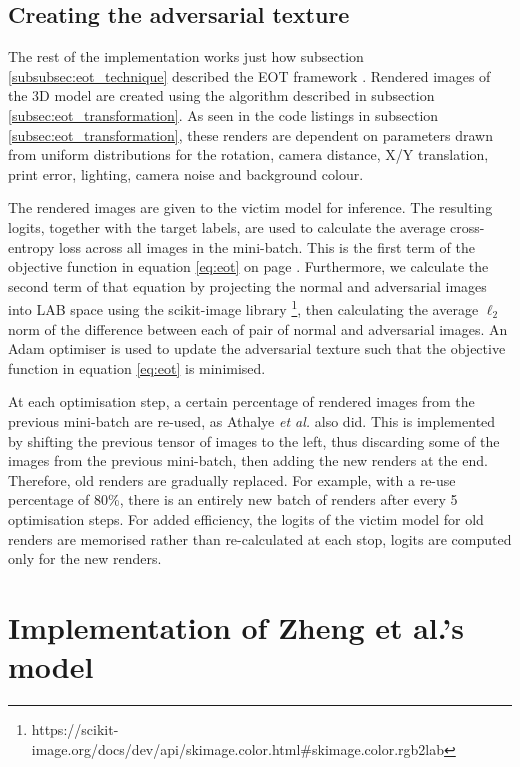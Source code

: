 \subsection{Creating the adversarial texture}

The rest of the implementation works just how subsection \ref{subsubsec:eot_technique} described the EOT framework \cite{athalye}. Rendered images of the 3D model are created using the algorithm described in subsection \ref{subsec:eot_transformation}. As seen in the code listings in subsection \ref{subsec:eot_transformation}, these renders are dependent on parameters drawn from uniform distributions for the rotation, camera distance, X/Y translation, print error, lighting, camera noise and background colour.

The rendered images are given to the victim model for inference. The resulting logits, together with the target labels, are used to calculate the average cross-entropy loss across all images in the mini-batch. This is the first term of the objective function in equation \ref{eq:eot} on page \pageref{eq:eot}. Furthermore, we calculate the second term of that equation by projecting the normal and adversarial images into LAB space \cite{lab} using the scikit-image library \footnote{https://scikit-image.org/docs/dev/api/skimage.color.html\#skimage.color.rgb2lab}, then calculating the average $\ell_2$ norm of the difference between each of pair of normal and adversarial images. An Adam optimiser is used to update the adversarial texture such that the objective function in equation \ref{eq:eot} is minimised.

At each optimisation step, a certain percentage of rendered images from the previous mini-batch are re-used, as Athalye \textit{et al.} also did. This is implemented by shifting the previous tensor of images to the left, thus discarding some of the images from the previous mini-batch, then adding the new renders at the end. Therefore, old renders are gradually replaced. For example, with a re-use percentage of 80\%, there is an entirely new batch of renders after every 5 optimisation steps. For added efficiency, the logits of the victim model for old renders are memorised rather than re-calculated at each stop, logits are computed only for the new renders.

\section{Implementation of Zheng et al.'s model}
    \label{sec:zheng_implementation}
    
